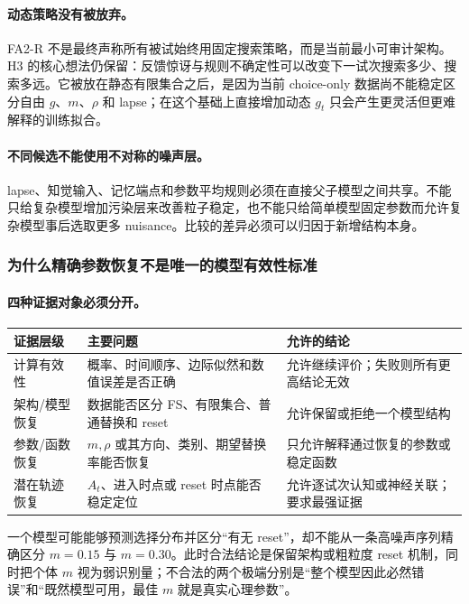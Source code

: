 \paragraph{动态策略没有被放弃。}
FA2-R 不是最终声称所有被试始终用固定搜索策略，而是当前最小可审计架构。H3 的核心想法仍保留：反馈惊讶与规则不确定性可以改变下一试次搜索多少、搜索多远。它被放在静态有限集合之后，是因为当前 choice-only 数据尚不能稳定区分自由 $g$、$m$、$\rho$ 和 lapse；在这个基础上直接增加动态 $g_t$ 只会产生更灵活但更难解释的训练拟合。

\paragraph{不同候选不能使用不对称的噪声层。}
lapse、知觉输入、记忆端点和参数平均规则必须在直接父子模型之间共享。不能只给复杂模型增加污染层来改善粒子稳定，也不能只给简单模型固定参数而允许复杂模型事后选取更多 nuisance。比较的差异必须可以归因于新增结构本身。


\subsubsection{为什么精确参数恢复不是唯一的模型有效性标准}

\paragraph{四种证据对象必须分开。}
\begin{center}
\small
\begin{tabular}{p{}|p{}|p{}}
\hline
证据层级 & 主要问题 & 允许的结论\\
\hline
计算有效性 & 概率、时间顺序、边际似然和数值误差是否正确 & 允许继续评价；失败则所有更高结论无效\\
架构/模型恢复 & 数据能否区分 FS、有限集合、普通替换和 reset & 允许保留或拒绝一个模型结构\\
参数/函数恢复 & $m,\rho$ 或其方向、类别、期望替换率能否恢复 & 只允许解释通过恢复的参数或稳定函数\\
潜在轨迹恢复 & $A_t$、进入时点或 reset 时点能否稳定定位 & 允许逐试次认知或神经关联；要求最强证据\\
\hline
\end{tabular}
\normalsize
\end{center}
一个模型可能能够预测选择分布并区分“有无 reset”，却不能从一条高噪声序列精确区分 $m=0.15$ 与 $m=0.30$。此时合法结论是保留架构或粗粒度 reset 机制，同时把个体 $m$ 视为弱识别量；不合法的两个极端分别是“整个模型因此必然错误”和“既然模型可用，最佳 $m$ 就是真实心理参数”。


